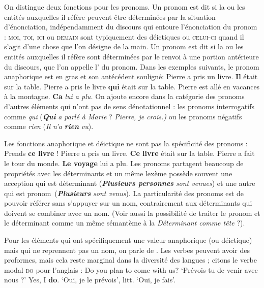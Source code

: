 {    On distingue deux fonctions pour les pronoms. Un pronom est dit  si la ou les entités auxquelles il réfère peuvent être déterminées par la situation d’énonciation, indépendamment du discours qui entoure l’énonciation du pronom : \textsc{moi,} \textsc{toi,} \textsc{ici} ou \textsc{demain} sont typiquement des déictiques ou \textsc{celui-ci} quand il s’agit d’une chose que l’on désigne de la main. Un pronom est dit  si la ou les entités auxquelles il réfère sont déterminées par le renvoi à une portion antérieure du discours, que l’on appelle l’\textstyleTermes{} du pronom. Dans les exemples suivants, le pronom anaphorique est en gras et son antécédent souligné:
\ea
    {Pierre a pris un livre.} \textbf{{Il}}  {était sur la table.}
\z
\ea
    {Pierre a pris le livre} \textbf{{qui}}  {était sur la table.}
\z
\ea
    {Pierre est allé en vacances à la montagne.} \textbf{{Ca}} \textit{lui a plu.}
\z
    On ajoute encore dans la catégorie des pronoms d’autres éléments qui n’ont pas de sens dénotationnel : les pronoms interrogatifs comme \textit{qui} (\textbf{\textit{Qui}} \textit{a parlé à Marie} ? \textit{Pierre, je crois.)} ou les pronoms négatifs comme \textit{rien} (\textit{Il n’a} \textbf{\textit{rien}} \textit{vu}).\textbf{ }

    Les fonctions anaphorique et déictique ne sont pas la spécificité des pronoms :
\ea
    {Prends} \textbf{{ce livre}} !
\z
\ea
    {Pierre a pris un livre.} \textbf{{Ce livre}}  {était sur la table.}
\z
\ea
    {Pierre a fait le tour du monde.} \textbf{{Le voyage}}  {lui a plu.}
\z
    Les pronoms partagent beaucoup de propriétés avec les déterminants et un même lexème possède souvent une acception qui est déterminant (\textbf{\textit{Plusieurs personnes}} \textit{sont venues}) et une autre qui est pronom~(\textbf{\textit{Plusieurs}} \textit{sont venus}). La particularité des pronoms est de pouvoir référer sans s’appuyer sur un nom, contrairement aux déterminants qui doivent se combiner avec un nom. (Voir aussi la possibilité de traiter le pronom et le déterminant comme un même sémantème à la  \textit{Déterminant comme tête} ?).

    Pour les éléments qui ont spécifiquement une valeur anaphorique (ou déictique) mais qui ne reprennent pas un nom, on parle de . Les verbes peuvent avoir des proformes, mais cela reste marginal dans la diversité des langues ; citons le verbe modal \textsc{do} pour l’anglais :
\ea
    {Do you plan to come with us?}   ‘Prévois-tu de venir avec nous ?’
\z
\ea
    {Yes, I} \textbf{{do}}.      ‘Oui, je le prévois’, litt. ‘Oui, je fais’.
\z
}
